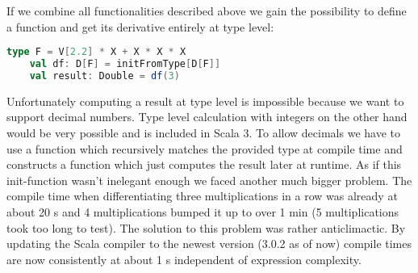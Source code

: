 If we combine all functionalities described above we gain the possibility to define a function and get its derivative entirely at type level:
\begin{lstlisting}[language=scala]
    type F = V[2.2] * X + X * X * X
    val df: D[F] = initFromType[D[F]]
    val result: Double = df(3)
\end{lstlisting}
Unfortunately computing a result at type level is impossible because we want to support decimal numbers. Type level calculation with integers on the other hand would be very possible and is included in Scala 3. To allow decimals we have to use a function  which recursively matches the provided type at compile time and constructs a function which just computes the result later at runtime. As if this init-function wasn't inelegant enough we faced another much bigger problem. The compile time when differentiating three multiplications in a row was already at about 20 s and 4 multiplications bumped it up to over 1 min (5 multiplications took too long to test). The solution to this problem was rather anticlimactic. By updating the Scala compiler to the newest version (3.0.2 as of now) compile times are now consistently at about 1 s independent of expression complexity.  